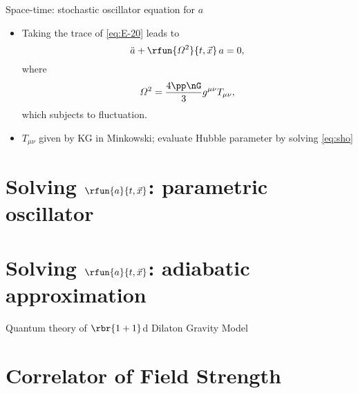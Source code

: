 \documentclass{beamer}
\begin{document}



\begin{frame}{Space-time: stochastic oscillator equation for $a$}
\begin{itemize}
\item Taking the trace of \cref{eq:E-20} leads to
\begin{equation}
\ddot a + \rfun{\varOmega^2}{t,\vec x}\, a = 0,
\label{eq:sho}
\end{equation}
where
\begin{equation}
\varOmega^2 = \frac{4\pp\nG}{3} g^{\mu\nu} T_{\mu\nu},
\end{equation}
which subjects to fluctuation.

\item $T_{\mu\nu}$ given by KG in Minkowski; evaluate Hubble parameter by 
solving \cref{eq:sho}
\end{itemize}


\end{frame}

\section{Solving $\rfun{a}{t,\vec{x}}$: parametric oscillator}

\section{Solving $\rfun{a}{t,\vec{x}}$: adiabatic approximation}




\begin{frame}[allowframebreaks]{Quantum theory of $\rbr{1+1}$d Dilaton Gravity 
Model}{%
}


\end{frame}

\section{Correlator of Field Strength}

\end{document}
